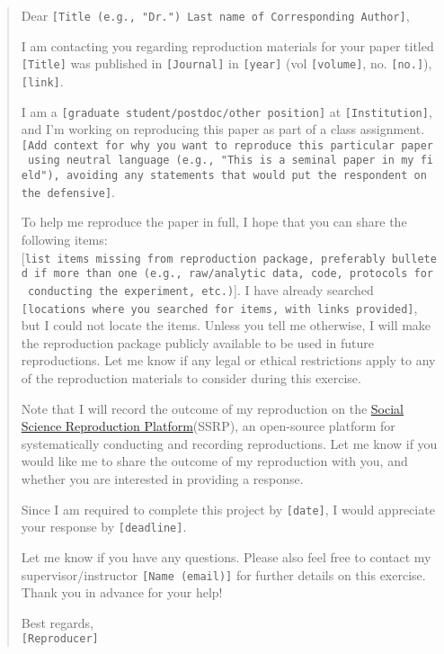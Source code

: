 \begin{quote}
Dear
\texttt{{[}Title\ (e.g.,\ "Dr.")\ Last\ name\ of\ Corresponding\ Author{]}},

I am contacting you regarding reproduction materials for your paper
titled \texttt{{[}Title{]}} was published in \texttt{{[}Journal{]}} in
\texttt{{[}year{]}} (vol \texttt{{[}volume{]}}, no. \texttt{{[}no.{]}}),
\texttt{{[}link{]}}.

I am a \texttt{{[}graduate\ student/postdoc/other\ position{]}} at
\texttt{{[}Institution{]}}, and I'm working on reproducing this paper as
part of a class assignment.
\texttt{{[}Add\ context\ for\ why\ you\ want\ to\ reproduce\ this\ particular\ paper\ using\ neutral\ language\ (e.g.,\ "This\ is\ a\ seminal\ paper\ in\ my\ field"),\ avoiding\ any\ statements\ that\ would\ put\ the\ respondent\ on\ the\ defensive{]}}.

To help me reproduce the paper in full, I hope that you can share the
following items:
{[}\texttt{list\ items\ missing\ from\ reproduction\ package,\ preferably\ bulleted\ if\ more\ than\ one\ (e.g.,\ raw/analytic\ data,\ code,\ protocols\ for\ conducting\ the\ experiment,\ etc.)}{]}.
I have already searched
\texttt{{[}locations\ where\ you\ searched\ for\ items,\ with\ links\ provided{]}},
but I could not locate the items. Unless you tell me otherwise, I will
make the reproduction package publicly available to be used in future
reproductions. Let me know if any legal or ethical restrictions apply to
any of the reproduction materials to consider during this exercise.

Note that I will record the outcome of my reproduction on the
\href{https://www.socialsciencereproduction.org/}{Social Science
Reproduction Platform}(SSRP), an open-source platform for systematically
conducting and recording reproductions. Let me know if you would like me
to share the outcome of my reproduction with you, and whether you are
interested in providing a response.

Since I am required to complete this project by \texttt{{[}date{]}}, I
would appreciate your response by \texttt{{[}deadline{]}}.

Let me know if you have any questions. Please also feel free to contact
my supervisor/instructor \texttt{{[}Name\ (email){]}} for further
details on this exercise. Thank you in advance for your help!

Best regards,\\
\texttt{{[}Reproducer{]}}
\end{quote}

